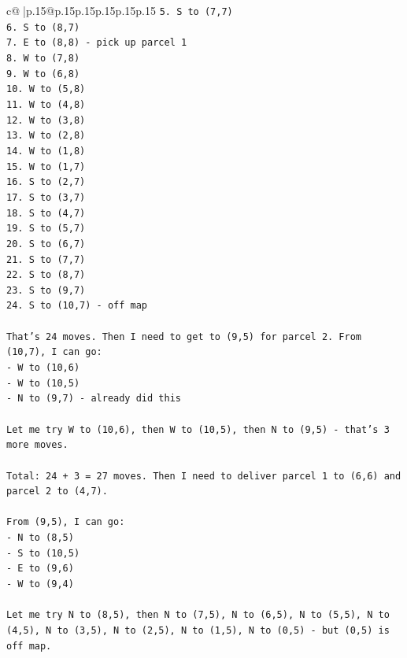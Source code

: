 \documentclass{article}
\begin{document}
{\begin{supertabular}{c@{$\;$}|p{.15\linewidth}@{}p{.15\linewidth}p{.15\linewidth}p{.15\linewidth}p{.15\linewidth}p{.15\linewidth}}
{{{\texttt{5. S to (7,7)} \\
\texttt{6. S to (8,7)} \\
\texttt{7. E to (8,8) {-} pick up parcel 1} \\
\texttt{8. W to (7,8)} \\
\texttt{9. W to (6,8)} \\
\texttt{10. W to (5,8)} \\
\texttt{11. W to (4,8)} \\
\texttt{12. W to (3,8)} \\
\texttt{13. W to (2,8)} \\
\texttt{14. W to (1,8)} \\
\texttt{15. W to (1,7)} \\
\texttt{16. S to (2,7)} \\
\texttt{17. S to (3,7)} \\
\texttt{18. S to (4,7)} \\
\texttt{19. S to (5,7)} \\
\texttt{20. S to (6,7)} \\
\texttt{21. S to (7,7)} \\
\texttt{22. S to (8,7)} \\
\texttt{23. S to (9,7)} \\
\texttt{24. S to (10,7) {-} off map} \\
\\ 
\texttt{That's 24 moves. Then I need to get to (9,5) for parcel 2. From (10,7), I can go:} \\
\texttt{{-} W to (10,6)} \\
\texttt{{-} W to (10,5)} \\
\texttt{{-} N to (9,7) {-} already did this} \\
\\ 
\texttt{Let me try W to (10,6), then W to (10,5), then N to (9,5) {-} that's 3 more moves.} \\
\\ 
\texttt{Total: 24 + 3 = 27 moves. Then I need to deliver parcel 1 to (6,6) and parcel 2 to (4,7).} \\
\\ 
\texttt{From (9,5), I can go:} \\
\texttt{{-} N to (8,5)} \\
\texttt{{-} S to (10,5)} \\
\texttt{{-} E to (9,6)} \\
\texttt{{-} W to (9,4)} \\
\\ 
\texttt{Let me try N to (8,5), then N to (7,5), N to (6,5), N to (5,5), N to (4,5), N to (3,5), N to (2,5), N to (1,5), N to (0,5) {-} but (0,5) is off map.} \\
}}}
\end{supertabular}}
\end{document}
